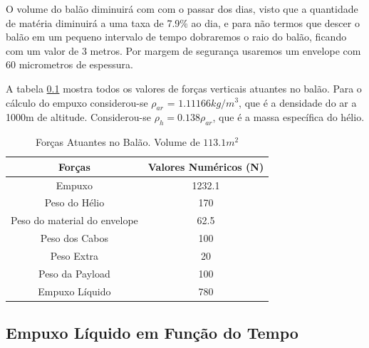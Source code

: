 O volume do balão diminuirá com com o passar dos dias, visto que a quantidade de matéria diminuirá a uma taxa de 7.9\% ao dia, e para não termos que descer o balão em um pequeno intervalo de tempo dobraremos o raio do balão, ficando com um valor de 3 metros. Por margem de segurança usaremos um envelope com 60 micrometros de espessura.

A tabela \ref{sub:empuxoLiquidoTempo} mostra todos os valores de forças verticais atuantes no balão. Para o cálculo do empuxo considerou-se $\rho_{ar}$ = $1.11166 kg/m^3$, que é a densidade do ar a 1000m de altitude. Considerou-se $\rho_{h} = 0.138 \rho_{ar}$, que é a massa específica do hélio.

\begin{table}[H]
	\centering
	\begin{tabular}{|c|c|}
		\hline
		\rowcolor[HTML]{FFFFFF}
		{\color[HTML]{000000} \textbf{Forças}} & {\color[HTML]{000000} \textbf{Valores Numéricos (N)}} \\ \hline
		Empuxo                                 & 1232.1                                                \\ \hline
		Peso do Hélio                          & 170                                                   \\ \hline
		Peso do material do envelope           & 62.5                                                  \\ \hline
		Peso dos Cabos                         & 100                                                   \\ \hline
		Peso Extra                             & 20                                                    \\ \hline
		Peso da Payload                        & 100                                                   \\ \hline
		Empuxo Líquido                         & 780                                                   \\ \hline
	\end{tabular}
	\caption[Forças Atuantes no Balão]{Forças Atuantes no Balão. Volume de $113.1 m^2$}
	\label{tab:forcasAtuantes}
\end{table}

\subsection{Empuxo Líquido em Função do Tempo} %
\label{sub:empuxoLiquidoTempo}

